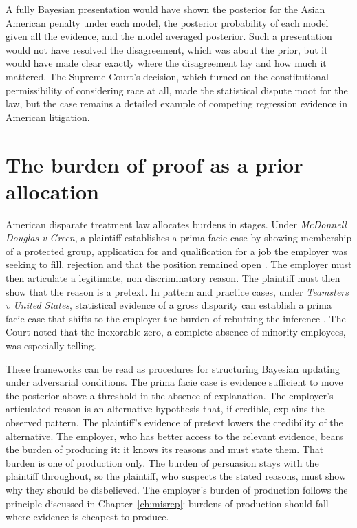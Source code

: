 A fully Bayesian presentation would have shown the posterior for the Asian American penalty under each model, the posterior probability of each model given all the evidence, and the model averaged posterior. Such a presentation would not have resolved the disagreement, which was about the prior, but it would have made clear exactly where the disagreement lay and how much it mattered. The Supreme Court's decision, which turned on the constitutional permissibility of considering race at all, made the statistical dispute moot for the law, but the case remains a detailed example of competing regression evidence in American litigation.

\section{The burden of proof as a prior allocation}

American disparate treatment law allocates burdens in stages. Under \emph{McDonnell Douglas v Green}, a plaintiff establishes a prima facie case by showing membership of a protected group, application for and qualification for a job the employer was seeking to fill, rejection and that the position remained open \citep{mcdonnell1973}. The employer must then articulate a legitimate, non discriminatory reason. The plaintiff must then show that the reason is a pretext. In pattern and practice cases, under \emph{Teamsters v United States}, statistical evidence of a gross disparity can establish a prima facie case that shifts to the employer the burden of rebutting the inference \citep{teamsters1977}. The Court noted that the inexorable zero, a complete absence of minority employees, was especially telling.

These frameworks can be read as procedures for structuring Bayesian updating under adversarial conditions. The prima facie case is evidence sufficient to move the posterior above a threshold in the absence of explanation. The employer's articulated reason is an alternative hypothesis that, if credible, explains the observed pattern. The plaintiff's evidence of pretext lowers the credibility of the alternative. The employer, who has better access to the relevant evidence, bears the burden of producing it: it knows its reasons and must state them. That burden is one of production only. The burden of persuasion stays with the plaintiff throughout, so the plaintiff, who suspects the stated reasons, must show why they should be disbelieved. The employer's burden of production follows the principle discussed in Chapter~\ref{ch:misrep}: burdens of production should fall where evidence is cheapest to produce.

